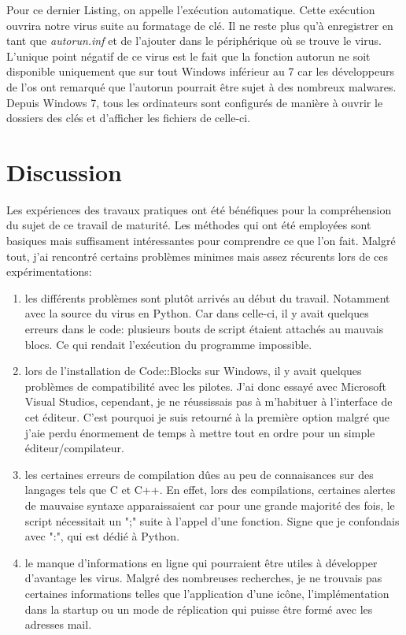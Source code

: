 \medskip
\medskip

Pour ce dernier Listing, on appelle l'exécution automatique. Cette exécution ouvrira notre virus suite au formatage de clé. Il ne reste plus qu'à enregistrer en tant que \textit{autorun.inf} et de l'ajouter dans le périphérique où se trouve le virus. 
L'unique point négatif de ce virus est le fait que la fonction autorun ne soit disponible uniquement que sur tout Windows inférieur au 7 car les développeurs de l'os ont remarqué que l'autorun pourrait être sujet à des nombreux malwares. Depuis Windows 7, tous les ordinateurs sont configurés de manière à ouvrir le dossiers des clés et d'afficher les fichiers de celle-ci.
    
\section{Discussion}
Les expériences des travaux pratiques ont été bénéfiques pour la compréhension du sujet de ce travail de maturité. Les méthodes qui ont été employées sont basiques mais suffisament intéressantes pour comprendre ce que l'on fait. Malgré tout, j'ai rencontré certains problèmes minimes mais assez récurents lors de ces expérimentations: 
\begin{enumerate}

\item les différents problèmes sont plutôt arrivés au début du travail. Notamment avec la source du virus en Python. Car dans celle-ci, il y avait quelques erreurs dans le code: plusieurs bouts de script étaient attachés au mauvais blocs. Ce qui rendait l'exécution du programme impossible.  

\item lors de l'installation de Code::Blocks sur Windows, il y avait quelques problèmes de compatibilité avec les pilotes. J'ai donc essayé avec Microsoft Visual Studios, cependant, je ne réussissais pas à m'habituer à l'interface de cet éditeur. C'est pourquoi je suis retourné à la première option malgré que j'aie perdu énormement de temps à mettre tout en ordre pour un simple éditeur/compilateur.

\item les certaines erreurs de compilation dûes au peu de connaisances sur des langages tels que C et C++. En effet, lors des compilations, certaines alertes de mauvaise syntaxe apparaissaient car pour une grande majorité des fois, le script nécessitait un ";" suite à l'appel d'une fonction. Signe que je confondais avec ":", qui est dédié à Python.

\item le manque d'informations en ligne qui pourraient être utiles à développer d'avantage les virus. Malgré des nombreuses recherches, je ne trouvais pas certaines informations telles que l'application d'une icône, l'implémentation dans la startup ou un mode de réplication qui puisse être formé avec les adresses mail.     
\end{enumerate}

